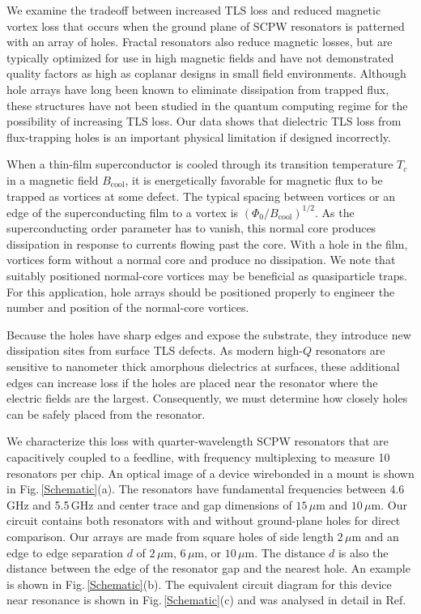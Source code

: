 We examine the tradeoff between increased TLS loss and reduced magnetic vortex loss that occurs when the ground plane of SCPW resonators is patterned with an array of holes.  Fractal resonators also reduce magnetic losses, but are typically optimized for use in high magnetic fields and have not demonstrated quality factors as high as coplanar designs in small field environments.\cite{graaf2012}  Although hole arrays have long been known to eliminate dissipation from trapped flux, \cite{song2009b, bothner2011, bothner2012} these structures have not been studied in the quantum computing regime for the possibility of increasing TLS loss. Our data shows that dielectric TLS loss from flux-trapping holes is an important physical limitation if designed incorrectly.

When a thin-film superconductor is cooled through its transition temperature $T_c$ in a magnetic field $B_{\textrm{cool}}$, it is energetically favorable for magnetic flux to be trapped as vortices at some defect\cite{stan2004}.  The typical spacing between vortices or an edge of the superconducting film to a vortex is $\left( \Phi_{0} / B_{\textrm{cool}} \right)^{1/2}$. As the superconducting order parameter has to vanish\cite{tinkham}, this normal core produces dissipation in response to currents flowing past the core\cite{song2009a}.  With a hole in the film, vortices form without a normal core and produce no dissipation.  We note that suitably positioned normal-core vortices may be beneficial as quasiparticle traps\cite{nsanzineza2014,wang2014}.  For this application, hole arrays should be positioned properly to engineer the number and position of the normal-core vortices. 

Because the holes have sharp edges and expose the substrate, they introduce new dissipation sites from surface TLS defects.  As modern high-$Q$ resonators are sensitive to  nanometer thick amorphous dielectrics at surfaces\cite{wenner2011}, these additional edges can increase loss if the holes are placed near the resonator where the electric fields are the largest.  Consequently, we must determine how closely holes can be safely placed from the resonator.

We characterize this loss with quarter-wavelength SCPW resonators that are capacitively coupled to a feedline, with frequency multiplexing to measure 10 resonators per chip.  An optical image of a device wirebonded in a mount is shown in Fig.\,\ref{Schematic}(a). The resonators have fundamental frequencies between 4.6\,GHz and 5.5\,GHz and center trace and gap dimensions of $15\,\mu\text{m}$ and $10\,\mu\text{m}$.  Our circuit contains both resonators with and without ground-plane holes for direct comparison.  Our arrays are made from square holes of side length $2\,\mu\text{m}$ and an edge to edge separation $d$ of $2\,\mu \text{m}$, $6\,\mu \text{m}$, or $10\,\mu \text{m}$.  The distance $d$ is also the distance between the edge of the resonator gap and the nearest hole.  An example is shown in Fig.\,\ref{Schematic}(b).  The equivalent circuit diagram for this device near resonance is shown in Fig.\,\ref{Schematic}(c) and was analysed in detail in Ref.%

